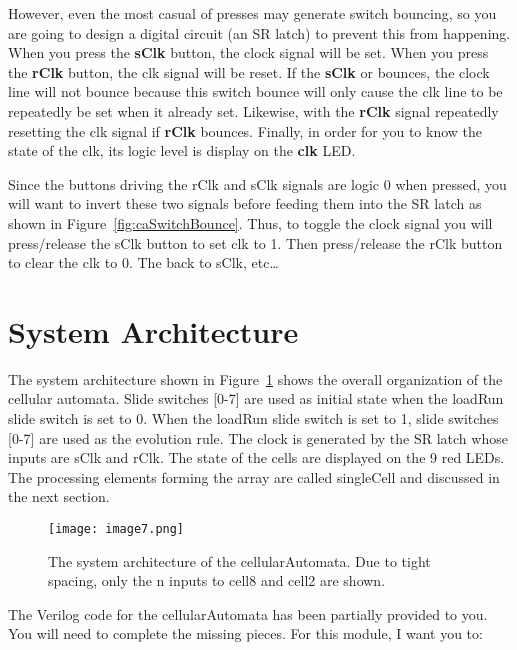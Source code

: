 However, even the most casual of presses may generate switch bouncing,
so you are going to design a digital circuit (an SR latch) to prevent
this from happening. When you press the \textbf{sClk} button, the clock
signal will be set. When you press the \textbf{rClk} button, the clk
signal will be reset. If the \textbf{sClk} or bounces, the clock line
will not bounce because this switch bounce will only cause the clk line
to be repeatedly be set when it already set. Likewise, with the
\textbf{rClk} signal repeatedly resetting the clk signal if
\textbf{rClk} bounces. Finally, in order for you to know the state of
the clk, its logic level is display on the \textbf{clk} LED.

Since the buttons driving the rClk and sClk signals are logic 0 when
pressed, you will want to invert these two signals before feeding them
into the SR latch as shown in Figure~\ref{fig:caSwitchBounce}. Thus, to 
toggle the clock signal
you will press/release the sClk button to set clk to 1. Then
press/release the rClk button to clear the clk to 0. The back to sClk,
etc\ldots{}



\section{System Architecture}

The system architecture shown in Figure~\ref{fig:caSysArch} shows the overall organization
of the cellular automata. Slide switches {[}0-7{]} are used as initial
state when the loadRun slide switch is set to 0. When the loadRun slide
switch is set to 1, slide switches {[}0-7{]} are used as the evolution
rule. The clock is generated by the SR latch whose inputs are sClk and
rClk. The state of the cells are displayed on the 9 red LEDs. The
processing elements forming the array are called singleCell and
discussed in the next section.

\begin{figure}[ht]
\texttt{[image: image7.png]}
\caption{The system architecture of the cellularAutomata. Due to tight
spacing, only the n inputs to cell8 and cell2 are shown.}
\label{fig:caSysArch}
\end{figure}

\protect\hypertarget{cellularAutomata_verilog}{}{}The Verilog code for
the cellularAutomata has been partially provided to you. You will need
to complete the missing pieces. For this module, I want you to:

